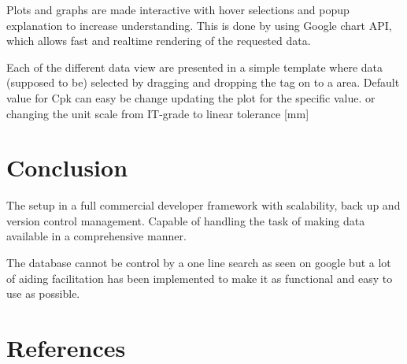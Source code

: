 \documentclass[aip,amsmath,reprint, author-year]{revtex4-1}
\begin{document}
Plots and graphs are made interactive with hover selections and popup explanation to increase understanding. This is done by using Google chart API, which allows fast and realtime rendering of the requested data.

Each of the different data view are presented in a simple template where data (supposed to be) selected by dragging and dropping the tag on to a area.
Default value for Cpk can easy be change updating the plot for the specific value. or changing the unit scale from IT-grade to linear tolerance [mm]

\section{Conclusion}
The setup in a full commercial developer framework with scalability, back up and version control management. Capable of handling the task of making data available in a comprehensive manner.

The database cannot be control by  a one line search as seen on google but a lot of aiding facilitation has been implemented to make it as functional and easy to use as possible.

\section*{References}

\end{document}
